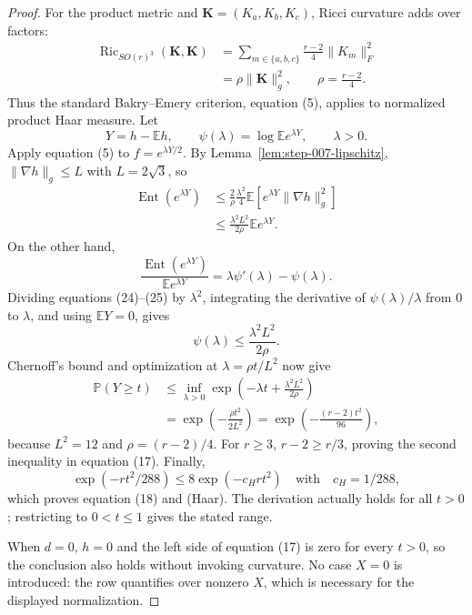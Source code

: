 \begin{proof}
For the product metric and
\(\mathbf K=(K_a,K_b,K_c)\), Ricci curvature adds over factors:
\[
\begin{aligned}
  \operatorname{Ric}_{SO(r)^3}(\mathbf K,\mathbf K)
  &=\sum_{m\in\{a,b,c\}}
    \frac{r-2}{4}\|K_m\|_F^2\\
  &=\rho\|\mathbf K\|_g^2,
  \qquad \rho=\frac{r-2}{4}.
\end{aligned}\tag{23}
\]
Thus the standard Bakry--Emery criterion, equation (5), applies to normalized
product Haar measure. Let
\[
  Y=h-\mathbb Eh,
  \qquad
  \psi(\lambda)=\log\mathbb E e^{\lambda Y},
  \qquad \lambda>0.
\]
Apply equation (5) to \(f=e^{\lambda Y/2}\). By
Lemma~\ref{lem:step-007-lipschitz}, \(\|\nabla h\|_g\le L\) with
\(L=2\sqrt3\), so
\[
\begin{aligned}
  \operatorname{Ent}(e^{\lambda Y})
  &\le \frac2\rho\frac{\lambda^2}{4}
    \mathbb E[e^{\lambda Y}\|\nabla h\|_g^2]\\
  &\le \frac{\lambda^2L^2}{2\rho}\mathbb E e^{\lambda Y}.
\end{aligned}\tag{24}
\]
On the other hand,
\[
  \frac{\operatorname{Ent}(e^{\lambda Y})}
       {\mathbb E e^{\lambda Y}}
  =\lambda\psi'(\lambda)-\psi(\lambda).                   \tag{25}
\]
Dividing equations (24)--(25) by \(\lambda^2\), integrating the derivative
of \(\psi(\lambda)/\lambda\) from \(0\) to \(\lambda\), and using
\(\mathbb EY=0\), gives
\[
  \psi(\lambda)\le\frac{\lambda^2L^2}{2\rho}.             \tag{26}
\]
Chernoff's bound and optimization at \(\lambda=\rho t/L^2\) now give
\[
\begin{aligned}
  \mathbb P(Y\ge t)
  &\le\inf_{\lambda>0}
    \exp\!\left(-\lambda t+\frac{\lambda^2L^2}{2\rho}\right)\\
  &=\exp\!\left(-\frac{\rho t^2}{2L^2}\right)
   =\exp\!\left(-\frac{(r-2)t^2}{96}\right),
\end{aligned}\tag{27}
\]
because \(L^2=12\) and \(\rho=(r-2)/4\). For \(r\ge3\),
\(r-2\ge r/3\), proving the second inequality in equation (17). Finally,
\[
  \exp(-rt^2/288)
  \le8\exp(-c_Hrt^2)
  \quad\text{with}\quad c_H=1/288,                         \tag{28}
\]
which proves equation (18) and (Haar). The derivation actually holds for all
\(t>0\); restricting to \(0<t\le1\) gives the stated range.

When \(d=0\), \(h=0\) and the left side of equation (17) is zero for every
\(t>0\), so the conclusion also holds without invoking curvature. No case
\(X=0\) is introduced: the row quantifies over nonzero \(X\), which
is necessary for the displayed normalization. 

\end{proof}

